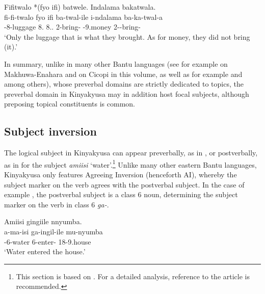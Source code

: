 \documentclass[output=paper]{langscibook}
\begin{document}
\ea
\label{ex:luggagenomoney}
Fifitwalo *(fyo ifi) batwele. Indalama bakatwala.\\
\gll
fi-fi-twalo  fyo  ifi  ba-twal-ile  i-ndalama  ba-ka-twal-a\\
\EXH{}-8-luggage  8.\IDCOP{}  8.\DEM.\PROX{}  2\SM{}-bring-\PFV{}  \AUG{}-9.money  2\SM-\NEG{}-bring-\FV{}\\
\glt
‘Only the luggage that is what they brought. As for money, they did not bring (it).’ \citep[336]{vanderWalLusekelo2022}\\

\z


In summary, unlike in many other Bantu languages (see for example  on Makhuwa\hyp Enahara and  on Cicopi in this volume, as well as for example \citealt{Zerbian2006} and \citealt{Yoneda2011} among others), whose preverbal domains are strictly dedicated to topics, the preverbal domain in Kinyakyusa may in addition host focal subjects, although preposing topical constituents is common.

\subsection{Subject inversion}
\label{bkm:Ref122073759}

The logical subject in Kinyakyusa can appear preverbally, as in , or postverbally, as in  for the subject \textit{amiisi} ‘water’.\footnote{This section is based on \citet{MsovelaEtAl2023}. For a detailed analysis, reference to the article is recommended.} 
 Unlike many other eastern Bantu languages, Kinyakyusa only features Agreeing Inversion (henceforth AI), whereby the subject marker on the verb agrees with the postverbal subject. In the case of example , the postverbal subject is a class 6 noun, determining the subject marker on the verb in class 6 \textit{ga-}.

\ea
\label{bkm:Ref122598826}
\ea
\label{bkm:Ref122598826:a}
Amiisi gingiile nnyumba.\\
\gll
a-ma-isi  ga-ingil-ile  mu-nyumba\\
\AUG{}-6-water  6\SM{}-enter-\PFV{}  18-9.house\\
\glt
‘Water entered the house.’\\
\end{document}
